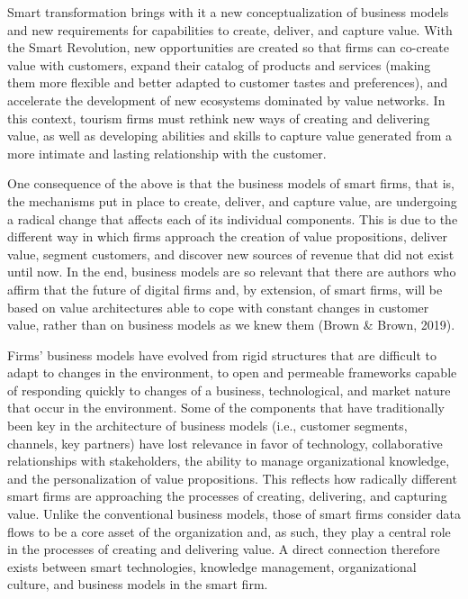 \documentclass[
  letterpaper,
  DIV=11,
  numbers=noendperiod]{scrreprt}
\begin{document}
Smart transformation brings with it a new conceptualization of business
models and new requirements for capabilities to create, deliver, and
capture value. With the Smart Revolution, new opportunities are created
so that firms can co-create value with customers, expand their catalog
of products and services (making them more flexible and better adapted
to customer tastes and preferences), and accelerate the development of
new ecosystems dominated by value networks. In this context, tourism
firms must rethink new ways of creating and delivering value, as well as
developing abilities and skills to capture value generated from a more
intimate and lasting relationship with the customer.

One consequence of the above is that the business models of smart firms,
that is, the mechanisms put in place to create, deliver, and capture
value, are undergoing a radical change that affects each of its
individual components. This is due to the different way in which firms
approach the creation of value propositions, deliver value, segment
customers, and discover new sources of revenue that did not exist until
now. In the end, business models are so relevant that there are authors
who affirm that the future of digital firms and, by extension, of smart
firms, will be based on value architectures able to cope with constant
changes in customer value, rather than on business models as we knew
them (Brown \& Brown, 2019).

Firms' business models have evolved from rigid structures that are
difficult to adapt to changes in the environment, to open and permeable
frameworks capable of responding quickly to changes of a business,
technological, and market nature that occur in the environment. Some of
the components that have traditionally been key in the architecture of
business models (i.e., customer segments, channels, key partners) have
lost relevance in favor of technology, collaborative relationships with
stakeholders, the ability to manage organizational knowledge, and the
personalization of value propositions. This reflects how radically
different smart firms are approaching the processes of creating,
delivering, and capturing value. Unlike the conventional business
models, those of smart firms consider data flows to be a core asset of
the organization and, as such, they play a central role in the processes
of creating and delivering value. A direct connection therefore exists
between smart technologies, knowledge management, organizational
culture, and business models in the smart firm.
\end{document}

